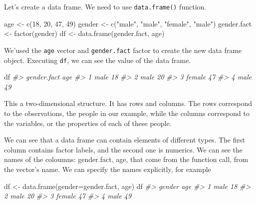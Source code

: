 \documentclass[
]{book}
\newenvironment{Shaded}{\begin{snugshade}}{\end{snugshade}}
\newcommand{\AttributeTok}[1]{\textcolor[rgb]{0.77,0.63,0.00}{#1}}
\newcommand{\CommentTok}[1]{\textcolor[rgb]{0.56,0.35,0.01}{\textit{#1}}}
\newcommand{\DecValTok}[1]{\textcolor[rgb]{0.00,0.00,0.81}{#1}}
\newcommand{\FunctionTok}[1]{\textcolor[rgb]{0.00,0.00,0.00}{#1}}
\newcommand{\NormalTok}[1]{#1}
\newcommand{\OtherTok}[1]{\textcolor[rgb]{0.56,0.35,0.01}{#1}}
\newcommand{\StringTok}[1]{\textcolor[rgb]{0.31,0.60,0.02}{#1}}
\begin{document}
Let's create a data frame. We need to use \texttt{data.frame()} function.

\begin{Shaded}
\begin{Highlighting}[]
\NormalTok{age }\OtherTok{\textless{}{-}} \FunctionTok{c}\NormalTok{(}\DecValTok{18}\NormalTok{, }\DecValTok{20}\NormalTok{, }\DecValTok{47}\NormalTok{, }\DecValTok{49}\NormalTok{)}
\NormalTok{gender }\OtherTok{\textless{}{-}} \FunctionTok{c}\NormalTok{(}\StringTok{"male"}\NormalTok{, }\StringTok{"male"}\NormalTok{, }\StringTok{"female"}\NormalTok{, }\StringTok{"male"}\NormalTok{) }
\NormalTok{gender.fact }\OtherTok{\textless{}{-}} \FunctionTok{factor}\NormalTok{(gender)}
\NormalTok{df }\OtherTok{\textless{}{-}} \FunctionTok{data.frame}\NormalTok{(gender.fact, age)}
\end{Highlighting}
\end{Shaded}

We'used the \texttt{age} vector and \texttt{gender.fact} factor to create the new data frame object. Executing \texttt{df}, we can see the value of the data frame.

\begin{Shaded}
\begin{Highlighting}[]
\NormalTok{df}
\CommentTok{\#\textgreater{}   gender.fact age}
\CommentTok{\#\textgreater{} 1        male  18}
\CommentTok{\#\textgreater{} 2        male  20}
\CommentTok{\#\textgreater{} 3      female  47}
\CommentTok{\#\textgreater{} 4        male  49}
\end{Highlighting}
\end{Shaded}

This a two-dimensional structure. It has rows and columns. The rows correspond to the observations, the people in our example, while the columns correspond to the variables, or the properties of each of these people.

We can see that a data frame can contain elements of different types. The first column contains factor labels, and the second one is numerics. We can see the names of the coloumns: gender.fact, age, that come from the function call, from the vector's name. We can specify the names explicitly, for example

\begin{Shaded}
\begin{Highlighting}[]
\NormalTok{df }\OtherTok{\textless{}{-}} \FunctionTok{data.frame}\NormalTok{(}\AttributeTok{gender=}\NormalTok{gender.fact, age)}
\NormalTok{df}
\CommentTok{\#\textgreater{}   gender age}
\CommentTok{\#\textgreater{} 1   male  18}
\CommentTok{\#\textgreater{} 2   male  20}
\CommentTok{\#\textgreater{} 3 female  47}
\CommentTok{\#\textgreater{} 4   male  49}
\end{Highlighting}
\end{Shaded}
\end{document}
